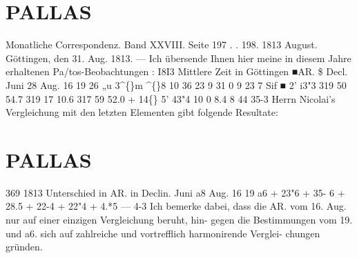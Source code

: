\documentclass[12pt,a4paper]{article}
\newcommand{\degree}{\textdegree}
\begin{document}
\section*{PALLAS}
Monatliche  Correspondenz.     Band  XXVIII.  Seite  197 . .  198.     1813  August. 
Göttingen,  den  31.  Aug.  1813. 
---   Ich  übersende  Ihnen  hier  meine  in  diesem  Jahre  erhaltenen  Pa/tos-Beobachtungen : 
I8I3 
Mittlere  Zeit 
in  Göttingen 
■AR.  \$ 
Decl. 
Juni  28 
Aug.  16 
19 
26 
„u  3\textasciicircum\{\}m     \textasciicircum\{\}8 
10    36     23 
9     31      0 
9     23       7 
Sif  ■  2'    i3"3 
319     50     54.7 
319     17     10.6 
317     59     52.0 
+  14\degree\{\}     5'    43"4 
10       0       8.4 
8     44     35-3 
Herrn  Nicolai's  Vergleichung  mit  den  letzten  Elementen  gibt  folgende  Resultate: 


\newpage

\section*{PALLAS}
369 
1813 
Unterschied 
in  AR.       in  Declin. 
Juni  a8 
Aug.  16 
19 
a6 
+  23"6 
+  35-  6 
+  28.5 
+  22-4 
+  22"4 
+    4.*5 
---    4-3 
Ich  bemerke  dabei,  dass  die  AR.  vom  16.  Aug.  nur  auf  einer  einzigen  Vergleichung  beruht,  hin- 
gegen die  Bestimmungen  vom  19.  und  a6.  sich  auf  zahlreiche  und  vortrefflich  harmonirende  Verglei- 
chungen  gründen. 
\end{document}
